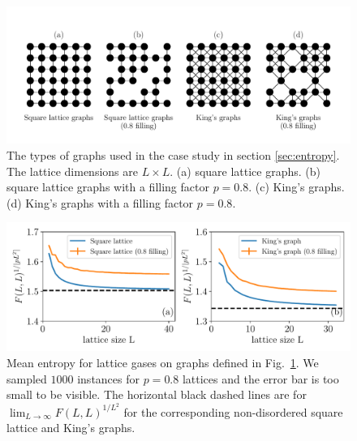 \documentclass[onefignum, onetabnum]{siamart190516}
\newcommand{\<}{\langle}
\renewcommand{\>}{\rangle}
\newcommand{\Fig}[1]{Fig.~\ref{#1}}
\begin{document}
\begin{figure}[t] 
    \centering
    \includegraphics[width=\textwidth, trim={0cm 1cm 0cm 0cm}, clip]{figures/lattices.pdf}
    \caption{The types of graphs used in the case study in section \ref{sec:entropy}.
    The lattice dimensions are $L\times L$. (a) square lattice graphs. (b) square lattice graphs with a filling factor $p=0.8$.
    (c) King's graphs. (d) King's graphs with a filling factor $p=0.8$.}
    \label{fig:lattices}
\end{figure}

\begin{figure}[t] 
    \centering
    \includegraphics[width=\textwidth, trim={0cm 0cm 0cm 0cm}, clip]{figures/fig5.pdf}
    \caption{Mean entropy for lattice gases on graphs defined in \Fig{fig:lattices}.
    We sampled $1000$ instances for $p=0.8$ lattices and the error bar is too small to be visible.
    The horizontal black dashed lines are for $\lim_{L\rightarrow \infty} F(L,L)^{1/L^2}$ for the corresponding non-disordered square lattice and King's graphs.
    }
    \label{fig:hardsquare}
\end{figure}
\end{document}
